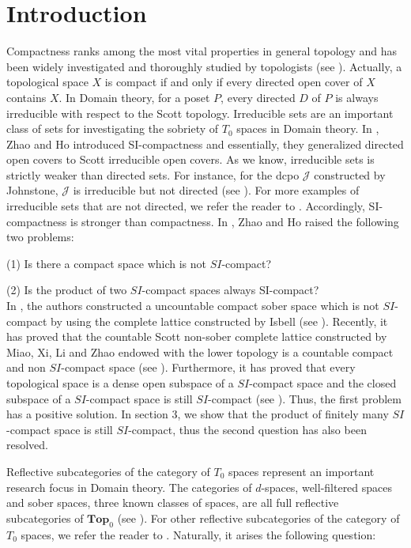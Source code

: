 \documentclass[preprint,12pt]{elsarticle}
\numberwithin{equation}{section}
\begin{document}

\section{Introduction}
\label{}

Compactness ranks among the most vital properties in general topology and has been widely investigated and thoroughly studied by topologists (see \cite{RE77}). Actually, a topological space $X$ is compact if and only if every directed open cover of $X$ contains $X$. In Domain theory, for a poset $P$, every directed $D$ of $P$ is always irreducible with respect to the Scott topology. Irreducible sets are an important class of sets for investigating the sobriety of \(T_0\) spaces in Domain theory. In \cite{DME15}, Zhao and Ho introduced SI-compactness and essentially, they generalized directed open covers to Scott irreducible open covers. As we know, irreducible sets is strictly weaker than directed sets. For instance, for the dcpo $\mathcal{J}$ constructed by Johnstone, $\mathcal{J}$ is irreducible but not directed (see \cite{PJ81}). For more examples of irreducible sets that are not directed, we refer the reader to \cite{ME182,E2,TH62}. Accordingly, SI-compactness is stronger than compactness. In \cite{DME15}, Zhao and Ho raised the following two problems:

(1) Is there a compact space which is not $SI$-compact?

(2) Is the product of two $SI$-compact spaces always SI-compact?\\
In \cite{HWQ21}, the authors constructed a uncountable compact sober space which is not $SI$-compact by using the complete lattice constructed by Isbell (see \cite{IJ82}). Recently, it has proved that the countable Scott non-sober complete lattice constructed by Miao, Xi, Li and Zhao \cite{AB75} endowed with the lower topology is a countable compact and non $SI$-compact space (see \cite{A11}). Furthermore, it has proved that every topological space is a dense open subspace of a $SI$-compact space and the closed subspace of a $SI$-compact space is still $SI$-compact (see \cite{A11}). Thus, the first problem has a positive solution. In section 3, we show that the product of finitely many $SI$-compact space is still $SI$-compact, thus the second question has also been resolved.

Reflective subcategories of the category of $T_{0}$ spaces represent an important research focus in Domain theory. The categories of $d$-spaces, well-filtered spaces and sober spaces, three known classes of spaces, are all full reflective subcategories of $\mathbf{Top}_{0}$ (see \cite{IOP82,GG03,I2}).  For other reflective subcategories of the category of \(T_0\) spaces, we refer the reader to \cite{I3,I4}.
Naturally, it arises the following question:
\end{document}
